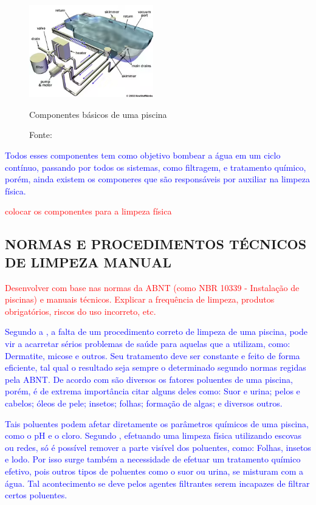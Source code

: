         \begin{figure}[H]
         	\centering
         	\caption{ }  
        	\centering
         	\label{fig:cont}
        	\includegraphics[width=0.48\textwidth]{imagens/componentesPiscina.png}
            \caption*{Componentes básicos de uma piscina}
        	\caption*{Fonte: \cite{refComponents}}
         \end{figure}

        \textcolor{blue}{Todos esses componentes tem como objetivo bombear a água em um ciclo contínuo, passando por todos os sistemas, como filtragem, e tratamento químico, porém, ainda existem os componeres que são responsáveis por auxiliar na limpeza física.}

         \textcolor{red}{colocar os componentes para a limpeza física}
        

    \subsection{NORMAS E PROCEDIMENTOS TÉCNICOS DE LIMPEZA MANUAL}

       \textcolor{red}{Desenvolver com base nas normas da ABNT (como NBR 10339 - Instalação de piscinas) e manuais técnicos. Explicar a frequência de limpeza, produtos obrigatórios, riscos do uso incorreto, etc.}

       \textcolor{blue}{Segundo a \cite{piscineiroProfissional}, a falta de um procedimento correto de limpeza de uma piscina, pode vir a acarretar sérios problemas de saúde para aquelas que a utilizam, como: Dermatite, micose e outros. Seu tratamento deve ser constante e feito de forma eficiente, tal qual o resultado seja sempre o determinado segundo normas regidas pela ABNT. De acordo com \cite{guiaTratamento} são diversos os fatores poluentes de uma piscina, porém, é de extrema importância citar alguns deles como: Suor e urina; pelos e cabelos; óleos de pele; insetos; folhas; formação de algas; e diversos outros.}

       \textcolor{blue}{Tais poluentes podem afetar diretamente os parâmetros químicos de uma piscina, como o pH e o cloro. Segundo \cite{guiaTratamento}, efetuando uma limpeza física utilizando escovas ou redes, só é possível remover a parte visível dos poluentes, como: Folhas, insetos e lodo. Por isso surge também a necessidade de efetuar um tratamento químico efetivo, pois outros tipos de poluentes como o suor ou urina, se misturam com a água. Tal acontecimento se deve pelos agentes filtrantes serem incapazes de filtrar certos poluentes.}

